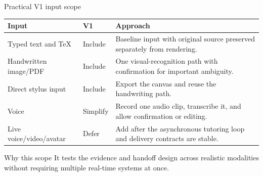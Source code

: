 \documentclass[aspectratio=169,10pt]{beamer}
\begin{document}
\begin{frame}{Practical V1 input scope}
\small
\begin{tabularx}{\textwidth}{@{}p{}p{}X@{}}
\toprule
\textbf{Input} & \textbf{V1} & \textbf{Approach} \\
\midrule
Typed text and TeX & Include & Baseline input with original source preserved separately from rendering. \\
\addlinespace
Handwritten image/PDF & Include & One visual-recognition path with confirmation for important ambiguity. \\
\addlinespace
Direct stylus input & Include & Export the canvas and reuse the handwriting path. \\
\addlinespace
Voice & Simplify & Record one audio clip, transcribe it, and allow confirmation or editing. \\
\addlinespace
Live voice/video/avatar & Defer & Add after the asynchronous tutoring loop and delivery contracts are stable. \\
\bottomrule
\end{tabularx}
\vspace{.55em}
\begin{block}{Why this scope}
It tests the evidence and handoff design across realistic modalities without requiring multiple real-time systems at once.
\end{block}
\end{frame}
\end{document}
